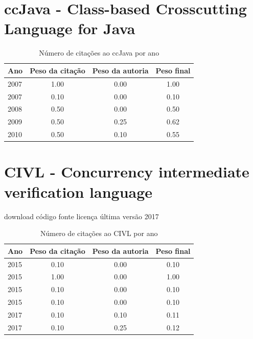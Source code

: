 \section{ccJava - Class-based Crosscutting Language for Java}
\begin{table}[H]
\caption{Número de citações ao ccJava  por ano}
\centering
\begin{tabular}{| l | c | c | c |}
  \hline
  Ano & Peso da citação & Peso da autoria & Peso final \\
  \hline
  2007
    & 1.00
    & 0.00
    & {\color{blue} 1.00} \\
  2007
    & 0.10
    & 0.00
    & {\color{red} 0.10} \\
\hline
  2008
    & 0.50
    & 0.00
    & {\color{blue} 0.50} \\
\hline
  2009
    & 0.50
    & 0.25
    & {\color{blue} 0.62} \\
\hline
  2010
    & 0.50
    & 0.10
    & {\color{blue} 0.55} \\
\hline
\end{tabular}
\end{table}
\section{CIVL - Concurrency intermediate verification language}
\checkmark download
\checkmark código fonte
\checkmark licença
\checkmark última versão 2017
\begin{table}[H]
\caption{Número de citações ao CIVL  por ano}
\centering
\begin{tabular}{| l | c | c | c |}
  \hline
  Ano & Peso da citação & Peso da autoria & Peso final \\
  \hline
  2015
    & 0.10
    & 0.00
    & {\color{red} 0.10} \\
  2015
    & 1.00
    & 0.00
    & {\color{blue} 1.00} \\
  2015
    & 0.10
    & 0.00
    & {\color{red} 0.10} \\
  2015
    & 0.10
    & 0.00
    & {\color{red} 0.10} \\
\hline
  2017
    & 0.10
    & 0.10
    & {\color{red} 0.11} \\
  2017
    & 0.10
    & 0.25
    & {\color{red} 0.12} \\
\hline
\end{tabular}
\end{table}
